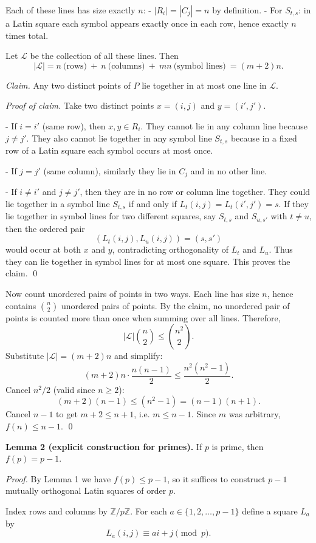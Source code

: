 Each of these lines has size exactly $n$:
- $|R_i|=|C_j|=n$ by definition.
- For $S_{t,s}$: in a Latin square each symbol appears exactly once in each row, hence exactly $n$ times total.

Let $\mathcal L$ be the collection of all these lines. Then
\[
|\mathcal L| = n \ \text{(rows)}\ +\ n\ \text{(columns)}\ +\ mn\ \text{(symbol lines)}\ = (m+2)n.
\]

\emph{Claim.} Any two distinct points of $P$ lie together in at most one line in $\mathcal L$.

\emph{Proof of claim.}
Take two distinct points $x=(i,j)$ and $y=(i',j')$.

- If $i=i'$ (same row), then $x,y\in R_i$. They cannot lie in any column line because $j\ne j'$. They also cannot lie together in any symbol line $S_{t,s}$ because in a fixed row of a Latin square each symbol occurs at most once.

- If $j=j'$ (same column), similarly they lie in $C_j$ and in no other line.

- If $i\ne i'$ and $j\ne j'$, then they are in no row or column line together. They could lie together in a symbol line $S_{t,s}$ if and only if $L_t(i,j)=L_t(i',j')=s$.
If they lie together in symbol lines for two different squares, say $S_{t,s}$ and $S_{u,s'}$ with $t\ne u$, then the ordered pair
\[(L_t(i,j),L_u(i,j))=(s,s')\]
would occur at both $x$ and $y$, contradicting orthogonality of $L_t$ and $L_u$.
Thus they can lie together in symbol lines for at most one square.
This proves the claim.
\qed

Now count unordered pairs of points in two ways.
Each line has size $n$, hence contains $\binom{n}{2}$ unordered pairs of points.
By the claim, no unordered pair of points is counted more than once when summing over all lines. Therefore,
\[
|\mathcal L|\binom{n}{2} \le \binom{n^2}{2}.
\]
Substitute $|\mathcal L|=(m+2)n$ and simplify:
\[
(m+2)n\cdot \frac{n(n-1)}{2} \le \frac{n^2(n^2-1)}{2}.
\]
Cancel $n^2/2$ (valid since $n\ge 2$):
\[
(m+2)(n-1) \le (n^2-1) = (n-1)(n+1).
\]
Cancel $n-1$ to get $m+2\le n+1$, i.e. $m\le n-1$.
Since $m$ was arbitrary, $f(n)\le n-1$.
\qed

\medskip

\textbf{Lemma 2 (explicit construction for primes).}
If $p$ is prime, then $f(p)=p-1$.

\emph{Proof.}
By Lemma 1 we have $f(p)\le p-1$, so it suffices to construct $p-1$ mutually orthogonal Latin squares of order $p$.

Index rows and columns by $\mathbb Z/p\mathbb Z$.
For each $a\in\{1,2,\dots,p-1\}$ define a square $L_a$ by
\[
L_a(i,j) \equiv ai + j \pmod p.
\]

